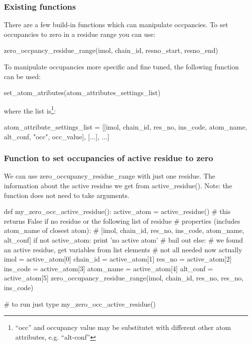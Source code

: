 \documentclass{article}
\begin{document}
\subsubsection{Existing functions}
There are a few build-in functions which can manipulate occpancies. To set 
occupancies to zero in a residue range you can use:

\begin{code}
 zero_occpancy_residue_range(imol, chain_id, resno_start, resno_end)
\end{code}

To manipulate occupancies more specific and fine tuned, the following function
can be used:

\begin{code}
 set_atom_atributes(atom_attributes_settings_list)
\end{code}

where the list is\footnote{``occ'' and occupancy value may be substitutet 
with different other atom attributes, e.g. ``alt-conf''}:

\begin{code}
 atom_attribute_settings_list = [[imol, chain_id, res_no, ins_code, atom_name,
                                alt_conf, "occ", occ_value], [...], ...]
\end{code}


\subsubsection{Function to set occupancies of active residue to zero}
We can use zero\_occupancy\_residue\_range with just one residue. The 
information about the active residue we get from active\_residue().
Note: the function does not need to take arguments.

\begin{python}
def my_zero_occ_active_residue():
    active_atom = active_residue()
    # this returns False if no residue or the following list of residue
    # properties (includes atom_name of closest atom):
    # [imol, chain_id, res_no, ins_code, atom_name, alt_conf]
    if not active_atom:
        print 'no active atom'   # bail out
    else:
        # we found an active residue, get variables from list elements
        # not all needed now actually
        imol      = active_atom[0]
        chain_id  = active_atom[1]
        res_no    = active_atom[2]
        ins_code  = active_atom[3]
        atom_name = active_atom[4]
        alt_conf  = active_atom[5]
        zero_occupancy_residue_range(imol, chain_id, res_no, res_no, ins_code)

# to run just type
my_zero_occ_active_residue()
\end{python}
\end{document}
